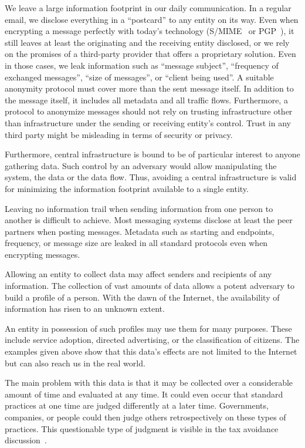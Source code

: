 We leave a large information footprint in our daily communication. In a regular email, we disclose everything in a ``postcard'' to any entity on its way. Even when encrypting a message perfectly with today's technology (S/MIME~\cite{rfc2045} or PGP~\cite{rfc2015}), it still leaves at least the originating and the receiving entity disclosed, or we rely on the promises of a third-party provider that offers a proprietary solution. Even in those cases, we leak information such as ``message subject'', ``frequency of exchanged messages'', ``size of messages'', or ``client being used''. A suitable anonymity protocol must cover more than the sent message itself. In addition to the message itself, it includes all metadata and all traffic flows. Furthermore, a protocol to anonymize messages should not rely on trusting infrastructure other than infrastructure under the sending or receiving entity's control. Trust in any third party might be misleading in terms of security or privacy.

Furthermore, central infrastructure is bound to be of particular interest to anyone gathering data. Such control by an adversary would allow manipulating the system, the data or the data flow. Thus, avoiding a central infrastructure is valid for minimizing the information footprint available to a single entity.

Leaving no information trail when sending information from one person to another is difficult to achieve. Most messaging systems disclose at least the peer partners when posting messages. Metadata such as starting and endpoints, frequency, or message size are leaked in all standard protocols even when encrypting messages.

Allowing an entity to collect data may affect senders and recipients of any information. The collection of vast amounts of data allows a potent adversary to build a profile of a person. With the dawn of the Internet, the availability of information has risen to an unknown extent.

An entity in possession of such profiles may use them for many purposes. These include service adoption, directed advertising, or the classification of citizens. The examples given above show that this data's effects are not limited to the Internet but can also reach us in the real world.

The main problem with this data is that it may be collected over a considerable amount of time and evaluated at any time. It could even occur that standard practices at one time are judged differently at a later time. Governments, companies, or people could then judge others retrospectively on these types of practices. This questionable type of judgment is visible in the tax avoidance discussion~\cite{Amat1999}. 

